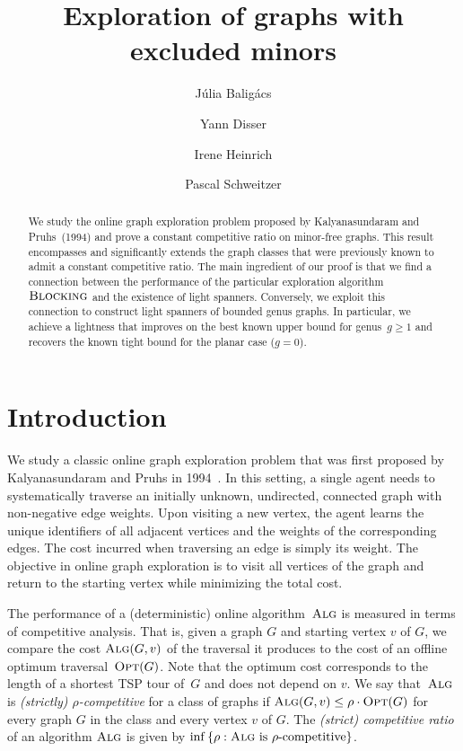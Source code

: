 \documentclass[a4paper,cleveref, autoref, thm-restate, thm-restate, UKenglish]{lipics-v2021}
\title{Exploration of graphs with excluded minors}
\author{Júlia Baligács}{Technische Universität Darmstadt, Germany}{baligacs@mathematik.tu-darmstadt.de}{https://orcid.org/0000-0003-2654-149X}{}
\author{Yann Disser}{Technische Universität Darmstadt, Germany  }{disser@mathematik.tu-darmstadt.de}{https://orcid.org/0000-0002-2085-0454}{}
\author{Irene Heinrich}{Technische Universität Darmstadt, Germany}{heinrich@mathematik.tu-darmstadt.de}{https://orcid.org/0000-0001-9191-1712}{}
\author{Pascal Schweitzer}{Technische Universität Darmstadt, Germany}{schweitzer@mathematik.tu-darmstadt.de}{}{}
\newcommand{\alg}{\textsc{Alg}}
\newcommand{\opt}{\textsc{Opt}}
\newcommand{\blocking}{\textsc{Blocking}}
\begin{document}
\begin{titlepage}


\maketitle

\begin{abstract}

We study the online graph exploration problem proposed by Kalyana\-sun\-daram and Pruhs~(1994) and prove a constant competitive ratio on minor-free graphs.
This result encompasses and significantly extends the graph classes that were previously known to admit a constant competitive ratio.
The main ingredient of our proof is that we find a connection between the performance of the particular exploration algorithm $\blocking$ and the existence of light spanners. 
Conversely, we exploit this connection to construct light spanners of bounded genus graphs.
In particular, we achieve a lightness that improves on the best known upper bound for genus~$g\geq 1$ and recovers the known tight bound for the planar case ($g=0$).


\end{abstract}


\end{titlepage}
\setcounter{page}{1}
\section{Introduction}
\label{sec:typesetting-summary}

We study a classic online graph exploration problem that was first proposed by Kalyana\-sun\-daram and Pruhs in 1994~\cite{pruhs94}.
In this setting, a single agent needs to systematically traverse an initially unknown, undirected, connected graph with non-negative edge weights.
Upon visiting a new vertex, the agent learns the unique identifiers of all adjacent vertices and the weights of the corresponding edges. The cost incurred when traversing an edge is simply its weight.
The objective in online graph exploration is to visit all vertices of the graph and return to the starting vertex while minimizing the total cost.

The performance of a (deterministic) online algorithm~$\alg$ is measured in terms of competitive analysis.
That is, given a graph $G$ and starting vertex $v$ of $G$, we compare the cost $\alg(G,v)$ of the traversal it produces to the cost of an offline optimum traversal~$\opt(G)$. 
Note that the optimum cost corresponds to the length of a shortest TSP tour of~$G$ and does not depend on $v$. 
We say that~$\alg$ is \emph{(strictly) $\rho$-competitive} for a class of graphs if $\alg(G,v) \leq \rho \cdot \opt (G)$ for every graph $G$ in the class and every vertex $v$ of $G$. 
The \emph{(strict) competitive ratio} of an algorithm $\alg$ is given by $\inf \left\{ \rho : \alg \text{ is $\rho$-competitive} \right\}$. 
\end{document}
